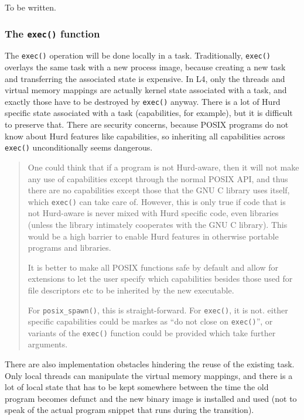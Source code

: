 \documentclass[9pt,a4paper]{extarticle}
\newenvironment{comment}{\footnotesize \begin{quote}}{\end{quote}}
\begin{document}
To be written.


\subsubsection{The \texttt{exec()} function}
\label{exec}

The \texttt{exec()} operation will be done locally in a task.
Traditionally, \texttt{exec()} overlays the same task with a new
process image, because creating a new task and transferring the
associated state is expensive.  In L4, only the threads and virtual
memory mappings are actually kernel state associated with a task, and
exactly those have to be destroyed by \texttt{exec()} anyway.  There
is a lot of Hurd specific state associated with a task (capabilities,
for example), but it is difficult to preserve that.  There are
security concerns, because POSIX programs do not know about Hurd
features like capabilities, so inheriting all capabilities across
\texttt{exec()} unconditionally seems dangerous.

\begin{comment}
  One could think that if a program is not Hurd-aware, then it will
  not make any use of capabilities except through the normal POSIX
  API, and thus there are no capabilities except those that the GNU C
  library uses itself, which \texttt{exec()} can take care of.
  However, this is only true if code that is not Hurd-aware is never
  mixed with Hurd specific code, even libraries (unless the library
  intimately cooperates with the GNU C library).  This would be a high
  barrier to enable Hurd features in otherwise portable programs and
  libraries.
  
  It is better to make all POSIX functions safe by default and allow
  for extensions to let the user specify which capabilities besides
  those used for file descriptors etc to be inherited by the new
  executable.
  
  For \verb/posix_spawn()/, this is straight-forward.  For
  \texttt{exec()}, it is not. either specific capabilities could be
  markes as ``do not close on \texttt{exec()}'', or variants of the
  \texttt{exec()} function could be provided which take further
  arguments.
\end{comment}

There are also implementation obstacles hindering the reuse of the
existing task.  Only local threads can manipulate the virtual memory
mappings, and there is a lot of local state that has to be kept
somewhere between the time the old program becomes defunct and the new
binary image is installed and used (not to speak of the actual program
snippet that runs during the transition).
\end{document}
